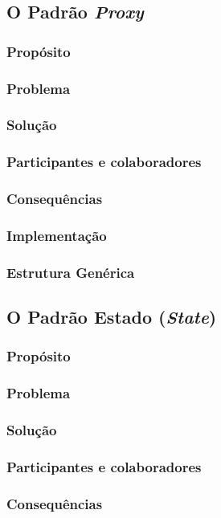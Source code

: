 \documentclass[
	11pt,				%
	openright,
	twoside,			%
	a4paper,			%
	english,			%
	french,
	brazil,				%
	sumario=tradicional
	]{abntex2}
\begin{document}
\subsection{O Padrão \textit{Proxy}}
\subsubsection{Propósito}
\subsubsection{Problema}
\subsubsection{Solução}
\subsubsection{Participantes e colaboradores}
\subsubsection{Consequências}
\subsubsection{Implementação}
\subsubsection{Estrutura Genérica}

\subsection{O Padrão Estado (\textit{State})}
\subsubsection{Propósito}
\subsubsection{Problema}
\subsubsection{Solução}
\subsubsection{Participantes e colaboradores}
\subsubsection{Consequências}
\end{document}
